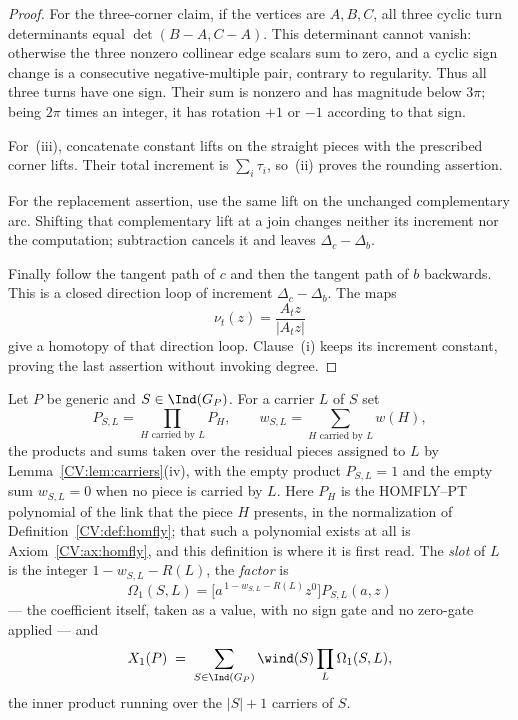 \begin{proof}
For the three-corner claim, if the vertices are $A,B,C$, all three cyclic turn
determinants equal $\det(B-A,C-A)$. This determinant cannot vanish: otherwise
the three nonzero collinear edge scalars sum to zero, and a cyclic sign change
is a consecutive negative-multiple pair, contrary to regularity. Thus all
three turns have one sign. Their sum is nonzero and has magnitude below
$3\pi$; being $2\pi$ times an integer, it has rotation $+1$ or $-1$ according
to that sign.

For~(iii), concatenate constant lifts on the straight pieces with the
prescribed corner lifts. Their total increment is $\sum_i\tau_i$, so~(ii)
proves the rounding assertion.

For the replacement assertion, use the same lift on the unchanged
complementary arc. Shifting that complementary lift at a join changes neither
its increment nor the computation; subtraction cancels it and leaves
$\Delta_c-\Delta_b$.

Finally follow the tangent path of $c$ and then the tangent path of $b$
backwards. This is a closed direction loop of increment
$\Delta_c-\Delta_b$. The maps
\[
   \nu_t(z)=\frac{A_tz}{|A_tz|}
\]
give a homotopy of that direction loop. Clause~(i) keeps its increment
constant, proving the last assertion without invoking degree.
\end{proof}

\begin{definition}\label{CV:def:X1}\leanok{}
Let $P$ be generic and $S\in\Ind(G_P)$. For a carrier $L$ of $S$ set
\[
  P_{S,L}=\prod_{H\text{ carried by }L}P_H,\qquad
  w_{S,L}=\sum_{H\text{ carried by }L}w(H),
\]
the products and sums taken over the residual pieces assigned to $L$ by
Lemma~\ref{CV:lem:carriers}(iv), with the empty product $P_{S,L}=1$ and the empty
sum $w_{S,L}=0$ when no piece is carried by $L$. Here $P_H$ is the HOMFLY--PT
polynomial of the link that the piece $H$ presents, in the normalization of
Definition~\ref{CV:def:homfly}; that such a polynomial exists at all is
Axiom~\ref{CV:ax:homfly}, and this definition is where it is first read. The \emph{slot} of $L$ is the
integer $1-w_{S,L}-R(L)$, the \emph{factor} is
\[
   \Omega_1(S,L)=\bigl[a^{\,1-w_{S,L}-R(L)}z^{0}\bigr]P_{S,L}(a,z)
\]
--- the coefficient itself, taken as a value, with no sign gate and no
zero-gate applied --- and
\[
   X_1(P)\;=\;\sum_{S\in\Ind(G_P)}\wind(S)\prod_{L}\Omega_1(S,L),
\]
the inner product running over the $|S|+1$ carriers of $S$.
\end{definition}

